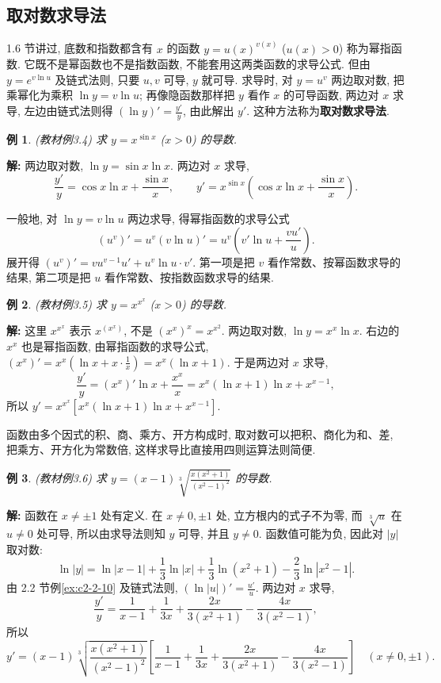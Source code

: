 \documentclass[UTF8,openany]{ctexbook}
\theoremstyle{chinesetextbook}
\newtheorem{example}{例}[section]
\newenvironment{cnsolution}{\par\indent\textbf{解:} \ignorespaces}{\par}
\begin{document}
\subsection{取对数求导法}
1.6 节讲过, 底数和指数都含有 $x$ 的函数 $y=u(x)^{v(x)}$ ($u(x)>0$) 称为幂指函数. 它既不是幂函数也不是指数函数, 不能套用这两类函数的求导公式. 但由 $y=e^{v\ln u}$ 及链式法则, 只要 $u,v$ 可导, $y$ 就可导. 求导时, 对 $y=u^v$ 两边取对数, 把乘幂化为乘积 $\ln y=v\ln u$; 再像隐函数那样把 $y$ 看作 $x$ 的可导函数, 两边对 $x$ 求导, 左边由链式法则得 $\displaystyle(\ln y)'=\frac{y'}y$, 由此解出 $y'$. 这种方法称为\textbf{取对数求导法}.
\begin{example}\label{ex:c2-3-4}
\textnormal{(教材例3.4)} 求 $y=x^{\sin x}$ ($x>0$) 的导数.
\end{example}
\begin{cnsolution}
两边取对数, $\ln y=\sin x\ln x$. 两边对 $x$ 求导,
\[
\frac{y'}y=\cos x\ln x+\frac{\sin x}x,\qquad y'=x^{\sin x}\left(\cos x\ln x+\frac{\sin x}x\right).
\]
\end{cnsolution}
一般地, 对 $\ln y=v\ln u$ 两边求导, 得幂指函数的求导公式
\[
\left(u^v\right)'=u^v(v\ln u)'=u^v\left(v'\ln u+\frac{vu'}u\right).
\]
展开得 $\left(u^v\right)'=vu^{v-1}u'+u^v\ln u\cdot v'$. 第一项是把 $v$ 看作常数、按幂函数求导的结果, 第二项是把 $u$ 看作常数、按指数函数求导的结果.
\begin{example}\label{ex:c2-3-5}
\textnormal{(教材例3.5)} 求 $y=x^{x^x}$ ($x>0$) 的导数.
\end{example}
\begin{cnsolution}
这里 $x^{x^x}$ 表示 $x^{(x^x)}$, 不是 $(x^x)^x=x^{x^2}$. 两边取对数, $\ln y=x^x\ln x$. 右边的 $x^x$ 也是幂指函数, 由幂指函数的求导公式, $\displaystyle(x^x)'=x^x\left(\ln x+x\cdot\frac1x\right)=x^x(\ln x+1)$. 于是两边对 $x$ 求导,
\[
\frac{y'}y=(x^x)'\ln x+\frac{x^x}x=x^x(\ln x+1)\ln x+x^{x-1},
\]
所以 $y'=x^{x^x}\left[x^x(\ln x+1)\ln x+x^{x-1}\right]$.
\end{cnsolution}
函数由多个因式的积、商、乘方、开方构成时, 取对数可以把积、商化为和、差, 把乘方、开方化为常数倍, 这样求导比直接用四则运算法则简便.
\begin{example}\label{ex:c2-3-6}
\textnormal{(教材例3.6)} 求 $\displaystyle y=(x-1)\sqrt[3]{\frac{x(x^2+1)}{(x^2-1)^2}}$ 的导数.
\end{example}
\begin{cnsolution}
函数在 $x\ne\pm1$ 处有定义. 在 $x\ne0,\pm1$ 处, 立方根内的式子不为零, 而 $\sqrt[3]u$ 在 $u\ne0$ 处可导, 所以由求导法则知 $y$ 可导, 并且 $y\ne0$. 函数值可能为负, 因此对 $|y|$ 取对数:
\[
\ln|y|=\ln|x-1|+\frac13\ln|x|+\frac13\ln(x^2+1)-\frac23\ln|x^2-1|.
\]
由 2.2 节例\ref{ex:c2-2-10} 及链式法则, $\displaystyle(\ln|u|)'=\frac{u'}u$. 两边对 $x$ 求导,
\[
\frac{y'}y=\frac1{x-1}+\frac1{3x}+\frac{2x}{3(x^2+1)}-\frac{4x}{3(x^2-1)},
\]
所以
\[
y'=(x-1)\sqrt[3]{\frac{x(x^2+1)}{(x^2-1)^2}}\left[\frac1{x-1}+\frac1{3x}+\frac{2x}{3(x^2+1)}-\frac{4x}{3(x^2-1)}\right]\quad(x\ne0,\pm1).
\]
\end{cnsolution}
\end{document}
